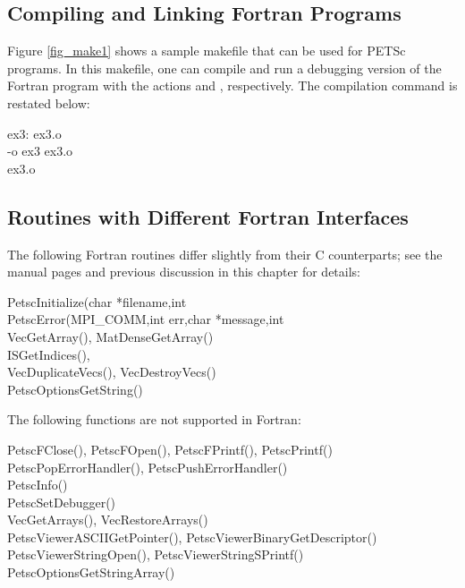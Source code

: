 \subsection{Compiling and Linking Fortran Programs}
\label{sec_fortcompile}

Figure \ref{fig_make1} shows a sample makefile that can be used for
PETSc programs.  In this makefile, one can compile and run a debugging version
of the Fortran program  with the actions    and
 , respectively. The compilation command is restated below:
\begin{tabbing}
   ex3: ex3.o \\
    -o ex3 ex3.o \\
    ex3.o
\end{tabbing}

\subsection{Routines with Different Fortran Interfaces}
\label{sec_fortran_exceptions}

The following Fortran routines differ slightly from their C counterparts; see the
manual pages and previous discussion in this chapter for details:
\begin{tabbing}
 PetscInitialize(char *filename,int \\
 PetscError(MPI\_COMM,int err,char *message,int \\
 VecGetArray(), MatDenseGetArray()\\
 ISGetIndices(), \\
 VecDuplicateVecs(), VecDestroyVecs()\\
 PetscOptionsGetString()
\end{tabbing}
The following functions are not supported in Fortran:
\begin{tabbing}
 PetscFClose(), PetscFOpen(), PetscFPrintf(), PetscPrintf()\\
 PetscPopErrorHandler(), PetscPushErrorHandler()\\
 PetscInfo()\\
 PetscSetDebugger()\\
 VecGetArrays(), VecRestoreArrays()\\
 PetscViewerASCIIGetPointer(), PetscViewerBinaryGetDescriptor()\\
 PetscViewerStringOpen(), PetscViewerStringSPrintf()\\
 PetscOptionsGetStringArray()
\end{tabbing}

